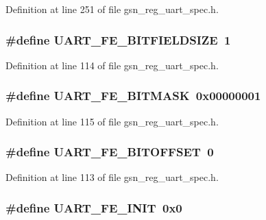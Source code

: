 Definition at line 251 of file gsn\_\-reg\_\-uart\_\-spec.h.

\hypertarget{a00575_a9f8df12876288fac20230fe809cf0425}{
\subsubsection[{UART\_\-FE\_\-BITFIELDSIZE}]{\setlength{\rightskip}{0pt plus 5cm}\#define UART\_\-FE\_\-BITFIELDSIZE~1}}
\label{a00575_a9f8df12876288fac20230fe809cf0425}


Definition at line 114 of file gsn\_\-reg\_\-uart\_\-spec.h.

\hypertarget{a00575_aed92d2e7fc1f8fcf6d015e6c04626b89}{
\subsubsection[{UART\_\-FE\_\-BITMASK}]{\setlength{\rightskip}{0pt plus 5cm}\#define UART\_\-FE\_\-BITMASK~0x00000001}}
\label{a00575_aed92d2e7fc1f8fcf6d015e6c04626b89}


Definition at line 115 of file gsn\_\-reg\_\-uart\_\-spec.h.

\hypertarget{a00575_a2d9fa70f2068427eb5f4168cd3254f68}{
\subsubsection[{UART\_\-FE\_\-BITOFFSET}]{\setlength{\rightskip}{0pt plus 5cm}\#define UART\_\-FE\_\-BITOFFSET~0}}
\label{a00575_a2d9fa70f2068427eb5f4168cd3254f68}


Definition at line 113 of file gsn\_\-reg\_\-uart\_\-spec.h.

\hypertarget{a00575_aef19bed93117e4bd3f5a657b8ded937c}{
\subsubsection[{UART\_\-FE\_\-INIT}]{\setlength{\rightskip}{0pt plus 5cm}\#define UART\_\-FE\_\-INIT~0x0}}
\label{a00575_aef19bed93117e4bd3f5a657b8ded937c}



